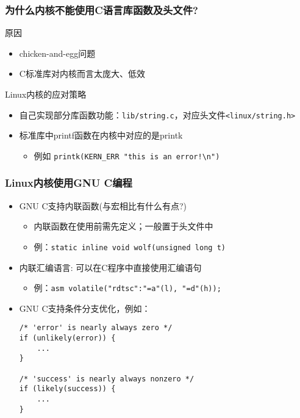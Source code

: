 \documentclass[xcolor=svgnames]{beamer}
\begin{document}
\begin{CJK*}{UTF8}{gbsn}
\begin{frame}[fragile]
\frametitle{为什么内核不能使用C语言库函数及头文件?}
\begin{block}{原因}
\begin{itemize}
\item chicken-and-egg问题
\item C标准库对内核而言太庞大、低效
\end{itemize}
\end{block}
\begin{block}{Linux内核的应对策略}
\begin{itemize}
\item 自己实现部分库函数功能：\verb|lib/string.c|，对应头文件\verb|<linux/string.h>|
\item 标准库中printf函数在内核中对应的是printk
\begin{itemize}
\item 例如 \verb|printk(KERN_ERR "this is an error!\n")|
\end{itemize}
\end{itemize}
\end{block}
\end{frame}

\begin{frame}[fragile]
\frametitle{Linux内核使用GNU C编程}
\begin{itemize}
\item GNU C支持内联函数(与宏相比有什么有点?)
\begin{itemize}
\item 内联函数在使用前需先定义；一般置于头文件中
\item 例：\verb|static inline void wolf(unsigned long t)|
\end{itemize}
\item 内联汇编语言: 可以在C程序中直接使用汇编语句
\begin{itemize}
\item 例：\verb|asm volatile("rdtsc":"=a"(l), "=d"(h));|
\end{itemize}
\item GNU C支持条件分支优化，例如：
\begin{verbatim}
/* 'error' is nearly always zero */
if (unlikely(error)) {
    ... 
}

/* 'success' is nearly always nonzero */
if (likely(success)) {
    ... 
}

\end{verbatim}
\end{itemize}
\end{frame}


\end{CJK*}
\end{document}
